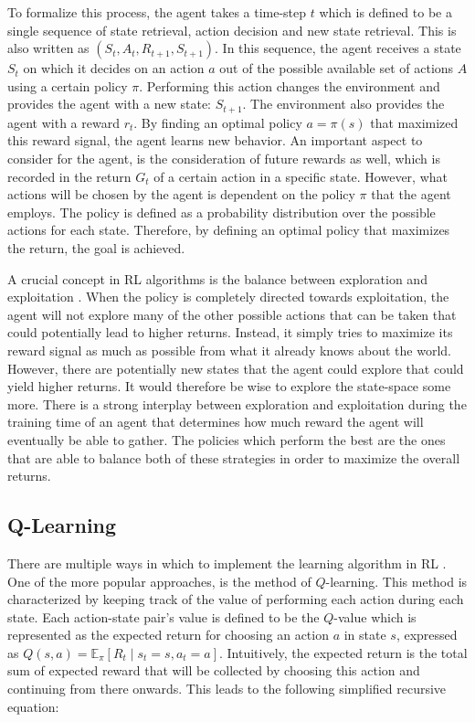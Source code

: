 To formalize this process, the agent takes a time-step $t$ which is defined to be a 
single sequence of 
state retrieval, action decision and new state retrieval. This is also written as 
$(S_t, A_t, R_{t+1}, S_{t+1})$.  In this sequence, the agent 
receives a state $S_t$ on which it decides on 
an action $a$ out of the possible available set of actions $A$ using a certain policy $\pi$.
Performing this action changes the environment and provides the agent with a 
new state: $S_{t+1}$. The environment also 
provides the agent with a reward $r_{t}$. By finding an optimal policy $a = \pi(s)$ 
that maximized this reward signal, the agent learns new behavior. An important aspect to consider 
for the agent, is the consideration 
of future rewards as well, which is 
recorded in the return $G_t$ of a certain action in a specific state. 
However, what actions will be chosen by the agent is dependent on the policy $\pi$
that the agent employs. The policy is defined as a probability distribution over
the possible actions for each state. Therefore, by defining an optimal policy 
that maximizes the return, the goal is achieved. 

A crucial concept in RL algorithms is the balance between exploration and exploitation \cite{RLBook}. 
When the policy is completely directed towards exploitation, the agent will 
not explore many of the other possible actions that can be taken that could 
potentially lead to higher returns. Instead, it simply tries to maximize its 
reward signal as much as possible from what it already knows about the world. However, 
there are potentially new states that the agent could explore that could yield 
higher returns. It would therefore be wise to explore the state-space some more. There is a 
strong interplay between exploration and exploitation during the training time of an 
agent that determines how much reward the agent will eventually be able to gather. 
The policies which perform the best are 
the ones that are able to balance both of these strategies in order to maximize 
the overall returns. 

\subsection{Q-Learning}
There are multiple ways in which to implement the learning algorithm in RL \cite{RLBook}. 
One of the more popular approaches, is the method of $Q$-learning. This 
method is characterized by keeping track of the value of performing each action during 
each state. Each action-state pair's value is defined to be the $Q$-value which 
is represented as the expected return for choosing an action $a$ in state $s$, 
expressed as $Q(s, a)=\mathbb{E}_{\pi}\left[R_{t} \mid s_{t}=s, a_{t}=a\right]$.
Intuitively, the expected return is the total sum of expected reward that will be 
collected by choosing this action and continuing from there onwards. This leads to 
the following simplified recursive equation:

